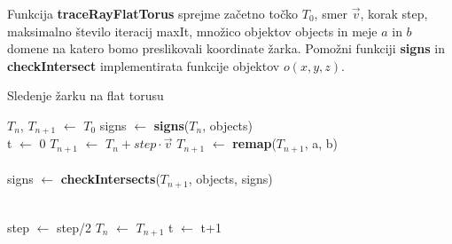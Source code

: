 \documentclass[titlepage]{article}
\begin{document}
Funkcija \textbf{traceRayFlatTorus} sprejme začetno točko $T_{0}$, smer $\vec{v}$, korak step, maksimalno število iteracij maxIt, množico objektov objects in meje $a$ in $b$ domene na katero bomo preslikovali koordinate žarka.
Pomožni funkciji \textbf{signs} in \textbf{checkIntersect} implementirata funkcije objektov \( o(x,y,z) \).
\begin{algorithm}[H]
    \caption{Sledenje žarku na flat torusu}
\begin{algorithmic}

    \State $T_{n}$, $T_{n+1}$ $\gets$ $T_{0}$
    \State signs $\gets$ \textbf{signs}($T_{n}$, objects)
    \\
    \State t $\gets$ 0
      \State {}
      \State {}
    \EndIf
    \State $T_{n+1}$ $\gets$ $T_{n}+step \cdot \vec{v}$
    \State $T_{n+1}$ $\gets$ \textbf{remap}($T_{n+1}$, a, b)
    \\
    \\
    \State signs $\gets$ \textbf{checkIntersects}($T_{n+1}$, objects, signs)
    \\
    \\

        \State step $\gets$ step/2
    \Else
      \State $T_{n}$ $\gets$ $T_{n+1}$
      \State t $\gets$ t+1
    \EndIf
  \EndWhile
\EndFunction
\end{algorithmic}
\end{algorithm}

\newpage
\end{document}
